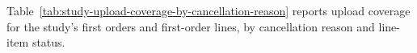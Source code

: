 \label{subsec:study-upload-coverage}
Table~\ref{tab:study-upload-coverage-by-cancellation-reason} reports upload coverage
for the study's first orders and first-order lines, by cancellation reason and line-item status.








\clearpage

\clearpage
\nolinenumbers
